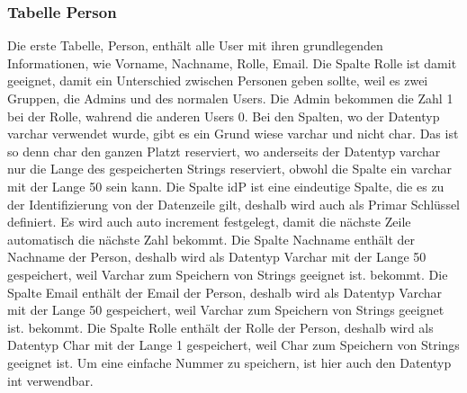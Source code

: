 \subsubsection{Tabelle Person}
Die erste Tabelle, Person, enthält alle User mit ihren grundlegenden Informationen, wie Vorname, Nachname, Rolle, Email. Die Spalte Rolle ist damit geeignet, damit ein Unterschied zwischen Personen geben sollte, weil es zwei Gruppen, die Admins und des normalen Users. Die Admin bekommen die Zahl 1 bei der Rolle, wahrend die anderen Users 0. Bei den Spalten, wo der Datentyp varchar verwendet wurde, gibt es ein Grund wiese varchar und nicht char. Das ist so denn char den ganzen Platzt reserviert, wo anderseits der Datentyp varchar nur die Lange des gespeicherten Strings reserviert, obwohl die Spalte ein varchar mit der Lange 50 sein kann.
\bigbreak
Die Spalte idP ist eine eindeutige Spalte, die es zu der Identifizierung von der Datenzeile gilt, deshalb wird auch als Primar Schlüssel definiert. Es wird auch auto increment festgelegt, damit die nächste Zeile automatisch die nächste Zahl bekommt.
\bigbreak
Die Spalte Nachname enthält der Nachname der Person, deshalb wird als Datentyp Varchar mit der Lange 50 gespeichert, weil Varchar zum Speichern von Strings geeignet ist.
bekommt.
\bigbreak
Die Spalte Email enthält der Email der Person, deshalb wird als Datentyp Varchar mit der Lange 50 gespeichert, weil Varchar zum Speichern von Strings geeignet ist.
bekommt.
\bigbreak
Die Spalte Rolle enthält der Rolle der Person, deshalb wird als Datentyp Char mit der Lange 1 gespeichert, weil Char zum Speichern von Strings geeignet ist. Um eine einfache Nummer zu speichern, ist hier auch den Datentyp int verwendbar.

